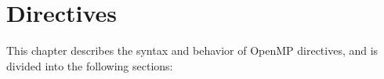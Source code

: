 %
%
%
%
%
%
%
%
%
%
%
%
%
\chapter{Directives}
\label{chap:Directives}
This chapter describes the syntax and behavior of OpenMP directives, and is divided
into the following sections:

